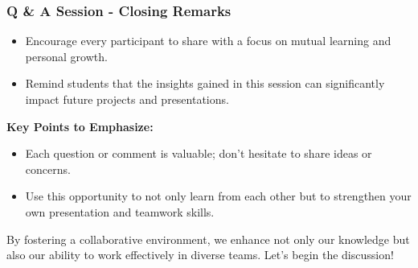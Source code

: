 \documentclass[aspectratio=169]{beamer}
\begin{document}
\begin{frame}[fragile]
    \frametitle{Q \& A Session - Closing Remarks}
    \begin{itemize}
        \item Encourage every participant to share with a focus on mutual learning and personal growth.
        \item Remind students that the insights gained in this session can significantly impact future projects and presentations.
    \end{itemize}
    
    \textbf{Key Points to Emphasize:}
    \begin{itemize}
        \item Each question or comment is valuable; don’t hesitate to share ideas or concerns.
        \item Use this opportunity to not only learn from each other but to strengthen your own presentation and teamwork skills.
    \end{itemize}
    
    By fostering a collaborative environment, we enhance not only our knowledge but also our ability to work effectively in diverse teams. Let's begin the discussion!
\end{frame}
\end{document}
